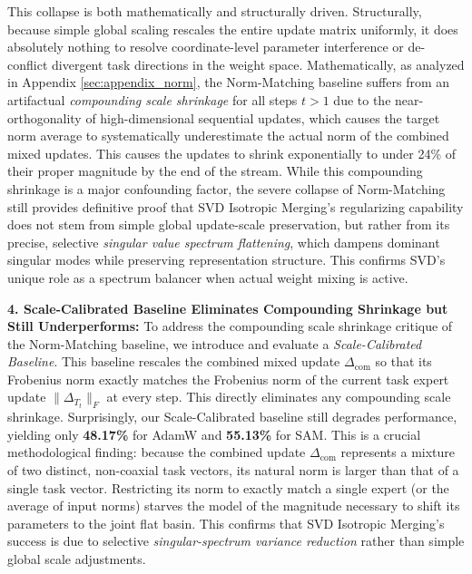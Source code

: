 This collapse is both mathematically and structurally driven. Structurally, because simple global scaling rescales the entire update matrix uniformly, it does absolutely nothing to resolve coordinate-level parameter interference or de-conflict divergent task directions in the weight space. Mathematically, as analyzed in Appendix \ref{sec:appendix_norm}, the Norm-Matching baseline suffers from an artifactual \emph{compounding scale shrinkage} for all steps $t > 1$ due to the near-orthogonality of high-dimensional sequential updates, which causes the target norm average to systematically underestimate the actual norm of the combined mixed updates. This causes the updates to shrink exponentially to under 24\% of their proper magnitude by the end of the stream. While this compounding shrinkage is a major confounding factor, the severe collapse of Norm-Matching still provides definitive proof that SVD Isotropic Merging's regularizing capability does not stem from simple global update-scale preservation, but rather from its precise, selective \emph{singular value spectrum flattening}, which dampens dominant singular modes while preserving representation structure. This confirms SVD's unique role as a spectrum balancer when actual weight mixing is active.

\textbf{4. Scale-Calibrated Baseline Eliminates Compounding Shrinkage but Still Underperforms:}
To address the compounding scale shrinkage critique of the Norm-Matching baseline, we introduce and evaluate a \emph{Scale-Calibrated Baseline}. This baseline rescales the combined mixed update $\Delta_{\text{com}}$ so that its Frobenius norm exactly matches the Frobenius norm of the current task expert update $\|\Delta_{T_t}\|_F$ at every step. This directly eliminates any compounding scale shrinkage. Surprisingly, our Scale-Calibrated baseline still degrades performance, yielding only \textbf{48.17\%} for AdamW and \textbf{55.13\%} for SAM. This is a crucial methodological finding: because the combined update $\Delta_{\text{com}}$ represents a mixture of two distinct, non-coaxial task vectors, its natural norm is larger than that of a single task vector. Restricting its norm to exactly match a single expert (or the average of input norms) starves the model of the magnitude necessary to shift its parameters to the joint flat basin. This confirms that SVD Isotropic Merging's success is due to selective \emph{singular-spectrum variance reduction} rather than simple global scale adjustments.

